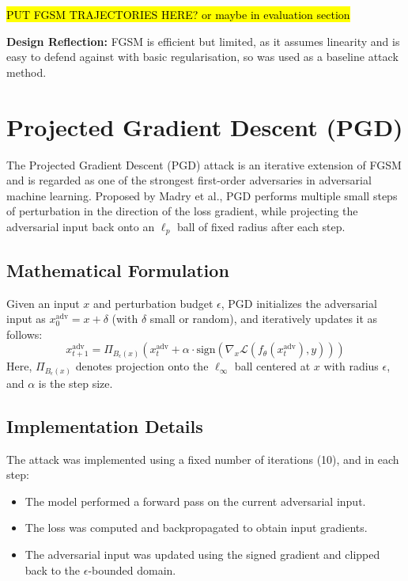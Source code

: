 \hl{PUT FGSM TRAJECTORIES HERE? or maybe in evaluation section}


\noindent \textbf{Design Reflection:}  
FGSM is efficient but limited, as it assumes linearity and is easy to defend against with basic regularisation, so was used as a baseline attack method.

\section{Projected Gradient Descent (PGD)}

The Projected Gradient Descent (PGD) attack is an iterative extension of FGSM and is regarded as one of the strongest first-order adversaries in adversarial machine learning. Proposed by Madry et al., PGD performs multiple small steps of perturbation in the direction of the loss gradient, while projecting the adversarial input back onto an $\ell_p$ ball of fixed radius after each step.

\subsection{Mathematical Formulation}
Given an input $x$ and perturbation budget $\epsilon$, PGD initializes the adversarial input as $x_0^{\text{adv}} = x + \delta$ (with $\delta$ small or random), and iteratively updates it as follows:
\[
x_{t+1}^{\text{adv}} = \Pi_{B_\epsilon(x)} \left( x_t^{\text{adv}} + \alpha \cdot \text{sign}\left( \nabla_x \mathcal{L}(f_\theta(x_t^{\text{adv}}), y) \right) \right)
\]
Here, $\Pi_{B_\epsilon(x)}$ denotes projection onto the $\ell_\infty$ ball centered at $x$ with radius $\epsilon$, and $\alpha$ is the step size.

\subsection{Implementation Details}
The attack was implemented using a fixed number of iterations (10), and in each step:
\begin{itemize}
    \item The model performed a forward pass on the current adversarial input.
    \item The loss was computed and backpropagated to obtain input gradients.
    \item The adversarial input was updated using the signed gradient and clipped back to the $\epsilon$-bounded domain.
\end{itemize}


